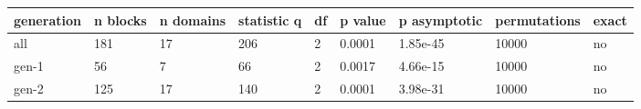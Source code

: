 \begin{tabular}{lllllllll}
\toprule
generation & n blocks & n domains & statistic q & df & p value & p asymptotic & permutations & exact \\
\midrule
all & 181 & 17 & 206 & 2 & 0.0001 & 1.85e-45 & 10000 & no \\
gen-1 & 56 & 7 & 66 & 2 & 0.0017 & 4.66e-15 & 10000 & no \\
gen-2 & 125 & 17 & 140 & 2 & 0.0001 & 3.98e-31 & 10000 & no \\
\bottomrule
\end{tabular}
